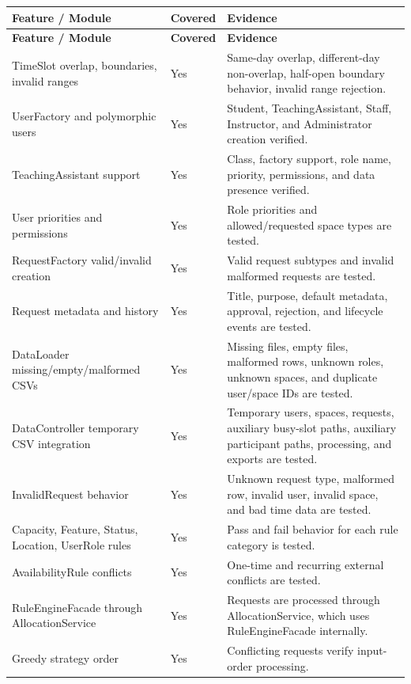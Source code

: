 \documentclass[12pt,a4paper]{article}
\begin{document}
\begin{longtable}{@{} p{5.2cm} p{2.2cm} p{7.0cm} @{}}
\toprule
\textbf{Feature / Module} & \textbf{Covered} & \textbf{Evidence} \\
\midrule
\endfirsthead

\toprule
\textbf{Feature / Module} & \textbf{Covered} & \textbf{Evidence} \\
\midrule
\endhead

TimeSlot overlap, boundaries, invalid ranges & Yes & Same-day overlap, different-day non-overlap, half-open boundary behavior, invalid range rejection. \\
UserFactory and polymorphic users & Yes & Student, TeachingAssistant, Staff, Instructor, and Administrator creation verified. \\
TeachingAssistant support & Yes & Class, factory support, role name, priority, permissions, and data presence verified. \\
User priorities and permissions & Yes & Role priorities and allowed/requested space types are tested. \\
RequestFactory valid/invalid creation & Yes & Valid request subtypes and invalid malformed requests are tested. \\
Request metadata and history & Yes & Title, purpose, default metadata, approval, rejection, and lifecycle events are tested. \\
DataLoader missing/empty/malformed CSVs & Yes & Missing files, empty files, malformed rows, unknown roles, unknown spaces, and duplicate user/space IDs are tested. \\
DataController temporary CSV integration & Yes & Temporary users, spaces, requests, auxiliary busy-slot paths, auxiliary participant paths, processing, and exports are tested. \\
InvalidRequest behavior & Yes & Unknown request type, malformed row, invalid user, invalid space, and bad time data are tested. \\
Capacity, Feature, Status, Location, UserRole rules & Yes & Pass and fail behavior for each rule category is tested. \\
AvailabilityRule conflicts & Yes & One-time and recurring external conflicts are tested. \\
RuleEngineFacade through AllocationService & Yes & Requests are processed through AllocationService, which uses RuleEngineFacade internally. \\
Greedy strategy order & Yes & Conflicting requests verify input-order processing. \\

\end{longtable}
\end{document}
